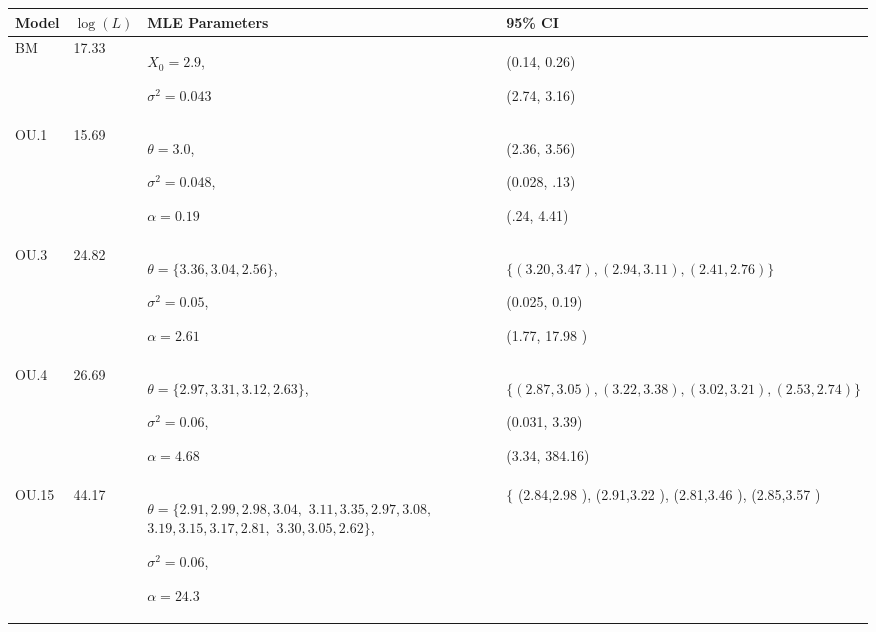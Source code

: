 \begin{table}
  \begin{center}
  \begin{tabular}{|l|l|p{4.2cm}|p{7.8cm}|}
\hline
Model & $\log(L)$ & \footnotesize MLE Parameters & 95\% CI 
\\
\hline
BM &
17.33 &
\footnotesize $X_0=2.9$, 

$\sigma^2 = 0.043$ 
&
\footnotesize

(0.14, 0.26) 

(2.74, 3.16)
\\
\hline

OU.1 & 
15.69 &
\footnotesize $\theta=3.0 $, 

$\sigma^2 =0.048 $, 

$\alpha = 0.19$  
& %
\footnotesize
(2.36, 3.56)

(0.028, .13)

(.24, 4.41)
\\
\hline

OU.3 &
24.82 & 
\footnotesize $\theta=\{3.36, 3.04, 2.56 \}$,

\footnotesize $\sigma^2 =0.05 $,

$\alpha =2.61 $ 
& %
\footnotesize
$\{(3.20, 3.47 ), (2.94,3.11), (2.41,2.76 ) \}$

(0.025, 0.19)

(1.77, 17.98 )
\\
\hline
OU.4 & 
26.69 & 
\footnotesize $\theta=\{2.97, 3.31, 3.12, 2.63 \}$,

\footnotesize $\sigma^2 =0.06 $, 

$\alpha =4.68 $ 
& %
\footnotesize
$\{(2.87, 3.05 ), (3.22, 3.38 ), (3.02, 3.21 ), (2.53, 2.74) \}$

(0.031, 3.39)

(3.34, 384.16)
\\
\hline
OU.15 &
44.17 &
\footnotesize $\theta=\{2.91, 2.99, 2.98, 3.04,$ 
$3.11, 3.35, 2.97, 3.08,$
$3.19, 3.15, 3.17, 2.81,$
$ 3.30, 3.05, 2.62 \}$, 

\footnotesize  $\sigma^2 =0.06 $, 

$\alpha =24.3 $
&  %
\footnotesize
$\{$ (2.84,2.98 ), (2.91,3.22 ), (2.81,3.46 ), (2.85,3.57 ) 


\end{tabular}
\end{center}
\end{table}
